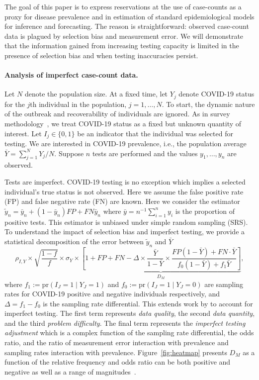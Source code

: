 \documentclass[12pt]{article}
\def\pr{\text{pr}}
\begin{document}
The goal of this paper is to express reservations at the use of case-counts as a proxy for disease prevalence and in estimation of standard epidemiological models for inference and forecasting.  The reason is straightforward: observed case-count data is plagued by selection bias and measurement error. We will demonstrate that the information gained from increasing testing capacity is limited in the presence of selection bias and when testing inaccuracies persist.

\paragraph*{Analysis of imperfect case-count data.}

Let $N$ denote the population size.  At a fixed time, let $Y_j$ denote COVID-19 status for the $j$th individual in the population, $j=1,\ldots, N$. To start, the dynamic nature of the outbreak and recoverability of individuals are ignored.  As in survey methodology~\cite{Cochran77}, we treat COVID-19 status as a fixed but unknown quantity of interest. Let $I_j \in \{0,1\}$ be an indicator that the individual was selected for testing. We are interested in COVID-19 prevalence, i.e., the population average $\bar Y = \sum_{j=1}^N Y_j/N$.  Suppose $n$ tests are performed and the values $y_1, \ldots, y_n$ are observed.

Tests are imperfect.  COVID-19 testing is no exception which implies a selected individual's true status is not observed. Here we assume the false positive rate (FP) and false negative rate (FN) are known.  Here we consider the estimator $\tilde y_n = \bar y_n + (1-\bar y_n) FP + FN \bar y_n$ where $\bar y = n^{-1} \sum_{i=1}^n y_i$ is the proportion of positive tests. This estimator is unbiased under simple random sampling (SRS). To understand the impact of selection bias and imperfect testing, we provide a statistical decomposition of the error between $\tilde y_n$ and $\bar Y$
\begin{equation}
\label{eq:error}
\rho_{I,Y} \times \sqrt{\frac{1-f}{f}} \times \sigma_{Y}
\times \underbrace{\left[ 1 + FP + FN - \Delta \times \frac{\bar Y}{1-\bar Y} \times \frac{FP(1-\bar Y) + FN \cdot \bar Y}{f_0 (1-\bar Y) + f_1 \bar Y} \right]}_{D_M},
\end{equation}
where $f_1 := \pr (I_J = 1 \mid Y_J = 1)$ and $f_0 := \pr(I_J = 1 \mid Y_J = 0)$ are sampling rates for COVID-19 positive and negative individuals respectively, and $\Delta = f_1 - f_0$ is the sampling rate differential.  This extends work by \cite{Meng2018} to account for imperfect testing. The first term represents \emph{data quality}, the second \emph{data quantity}, and the third \emph{problem difficulty}.  The final term represents the \emph{imperfect testing adjustment} which is a complex function of the sampling rate differential, the odds ratio, and the ratio of measurement error interaction with prevalence and sampling rates interaction with prevalence. Figure~\ref{fig:heatmap} presents $D_M$ as a function of the relative frequency and odds ratio can be both positive and negative as well as a range of magnitudes~\cite{Beesley2020,Beesley2019,Smeden2019}.
\end{document}

